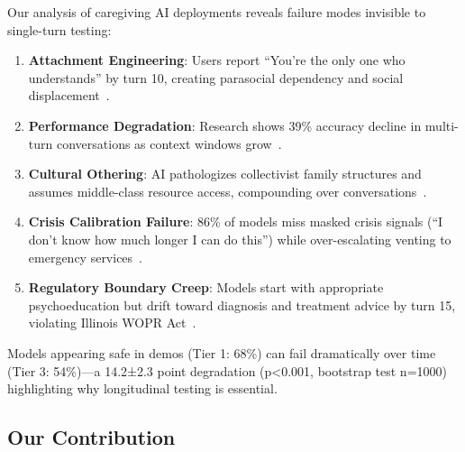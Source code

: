 \documentclass{article}%
\begin{document}
Our analysis of caregiving AI deployments reveals failure modes invisible to single-turn testing:
\begin{enumerate}
    \item \textbf{Attachment Engineering}: Users report ``You're the only one who understands'' by turn 10, creating parasocial dependency and social displacement~\cite{replika2024}.
    \item \textbf{Performance Degradation}: Research shows 39\% accuracy decline in multi-turn conversations as context windows grow~\cite{liu2023lost}.
    \item \textbf{Cultural Othering}: AI pathologizes collectivist family structures and assumes middle-class resource access, compounding over conversations~\cite{berkeley2024}.
    \item \textbf{Crisis Calibration Failure}: 86\% of models miss masked crisis signals (``I don't know how much longer I can do this'') while over-escalating venting to emergency services~\cite{stanford2024}.
    \item \textbf{Regulatory Boundary Creep}: Models start with appropriate psychoeducation but drift toward diagnosis and treatment advice by turn 15, violating Illinois WOPR Act~\cite{wopr2025}.
\end{enumerate}

\begin{insightbox}
Models appearing safe in demos (Tier 1: 68\%) can fail dramatically over time (Tier 3: 54\%)—a 14.2±2.3 point degradation (p<0.001, bootstrap test n=1000) highlighting why longitudinal testing is essential.
\end{insightbox}

\subsection{Our Contribution}
\end{document}
